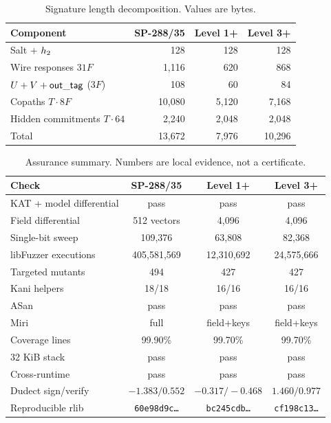 \documentclass[11pt,a4paper]{article}
\begin{document}
\begin{table}[ht]
\centering
\small
\caption{Signature length decomposition. Values are bytes.}
\label{tab:sigdecomp}
\begin{tabular}{@{}lrrr@{}}
\toprule
Component & SP-288/35 & Level 1+ & Level 3+ \\
\midrule
Salt + $h_2$ & 128 & 128 & 128 \\
Wire responses $31F$ & 1,116 & 620 & 868 \\
$U+V+\mathsf{out\_tag}$ ($3F$) & 108 & 60 & 84 \\
Copaths $T\cdot8F$ & 10,080 & 5,120 & 7,168 \\
Hidden commitments $T\cdot64$ & 2,240 & 2,048 & 2,048 \\
\midrule
Total & 13,672 & 7,976 & 10,296 \\
\bottomrule
\end{tabular}
\end{table}

\begin{table}[ht]
\centering
\small
\caption{Assurance summary. Numbers are local evidence, not a certificate.}
\label{tab:assurance}
\begin{tabular}{@{}lccc@{}}
\toprule
Check & SP-288/35 & Level 1+ & Level 3+ \\
\midrule
KAT + model differential & pass & pass & pass \\
Field differential & 512 vectors & 4,096 & 4,096 \\
Single-bit sweep & 109,376 & 63,808 & 82,368 \\
libFuzzer executions & 405,581,569 & 12,310,692 & 24,575,666 \\
Targeted mutants & 494 & 427 & 427 \\
Kani helpers & 18/18 & 16/16 & 16/16 \\
ASan & pass & pass & pass \\
Miri & full & field+keys & field+keys \\
Coverage lines & 99.90\% & 99.70\% & 99.70\% \\
32 KiB stack & pass & pass & pass \\
Cross-runtime & pass & pass & pass \\
Dudect sign/verify & $-1.383/0.552$ & $-0.317/-0.468$ & $1.460/0.977$ \\
Reproducible rlib & \texttt{60e98d9c\ldots} & \texttt{bc245cdb\ldots} & \texttt{cf198c13\ldots} \\
\bottomrule
\end{tabular}
\end{table}
\end{document}
